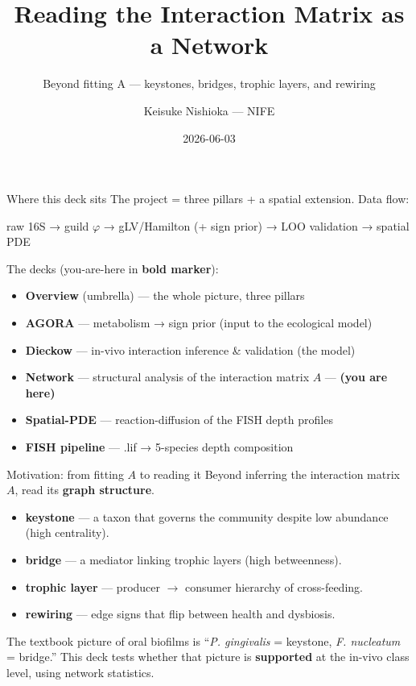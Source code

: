 \documentclass[
  ignorenonframetext,
  aspectratio=169,
]{beamer}
\title{Reading the Interaction Matrix as a Network}
\subtitle{Beyond fitting A --- keystones, bridges, trophic layers, and
rewiring}
\author{Keisuke Nishioka --- NIFE}
\date{2026-06-03}
\providecommand{\tightlist}{%
  \setlength{\itemsep}{0pt}\setlength{\parskip}{0pt}}
\begin{document}
\frame{\titlepage}

\begin{frame}{Where this deck sits}
\protect\hypertarget{where-this-deck-sits}{}
The project = three pillars + a spatial extension. Data flow:

raw 16S → guild \(\varphi\) → gLV/Hamilton (+ sign prior) → LOO
validation → spatial PDE

The decks (you-are-here in \textbf{bold marker}):

\begin{itemize}
\tightlist
\item
  \textbf{Overview} (umbrella) --- the whole picture, three pillars
\item
  \textbf{AGORA} --- metabolism → sign prior (input to the ecological
  model)
\item
  \textbf{Dieckow} --- in-vivo interaction inference \& validation (the
  model)
\item
  \textbf{Network} --- structural analysis of the interaction matrix
  \(A\) --- \textbf{(you are here)}
\item
  \textbf{Spatial-PDE} --- reaction-diffusion of the FISH depth profiles
\item
  \textbf{FISH pipeline} --- .lif → 5-species depth composition
\end{itemize}
\end{frame}

\begin{frame}{Motivation: from fitting \(A\) to reading it}
\protect\hypertarget{motivation-from-fitting-a-to-reading-it}{}
Beyond inferring the interaction matrix \(A\), read its \textbf{graph
structure}.

\begin{itemize}
\tightlist
\item
  \textbf{keystone} --- a taxon that governs the community despite low
  abundance (high centrality).
\item
  \textbf{bridge} --- a mediator linking trophic layers (high
  betweenness).
\item
  \textbf{trophic layer} --- producer \(\to\) consumer hierarchy of
  cross-feeding.
\item
  \textbf{rewiring} --- edge signs that flip between health and
  dysbiosis.
\end{itemize}

\vspace{0.4em}

The textbook picture of oral biofilms is ``\emph{P. gingivalis} =
keystone, \emph{F. nucleatum} = bridge.'' This deck tests whether that
picture is \textbf{supported} at the in-vivo class level, using network
statistics.
\end{frame}
\end{document}
